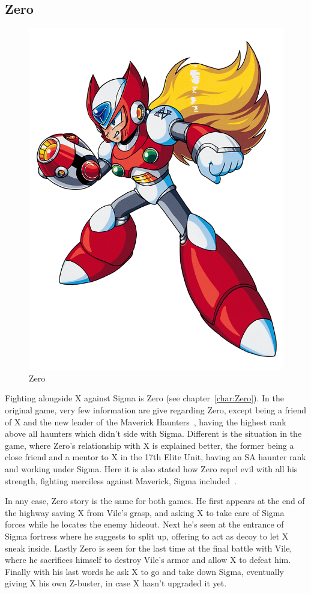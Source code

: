 \subsection{Zero}
\begin{figure}[htp]
	\centering
	\includegraphics[width=0.3\linewidth]{figures/X1/Zero_X1.png}
	\caption{Zero}
\end{figure}
Fighting alongside X against Sigma is Zero (see chapter~\ref{char:Zero}). In the original \x game, very few information are give regarding Zero, except being a friend of X and the new leader of the Maverick Haunters~\cite{X:Manual}, having the highest rank above all haunters which didn't side with Sigma. 
Different is the situation in the \mhx game, where Zero's relationship with X is explained better, the former being a close friend and a mentor to X in the 17th Elite Unit, having an SA haunter rank and working under Sigma. Here it is also stated how Zero repel evil with all his strength, fighting merciless against Maverick, Sigma included~\cite{Xcoll1:Manual_X1}.  

In any case, Zero story is the same for both games. He first appears at the end of the highway saving X from Vile's grasp, and asking X to take care of Sigma forces while he locates the enemy hideout. Next he's seen at the entrance of Sigma fortress where he suggests to split up, offering to act as decoy to let X sneak inside. Lastly Zero is seen for the last time at the final battle with Vile, where he sacrifices himself to destroy Vile's armor and allow X to defeat him. Finally with his last words he ask X to go and take down Sigma, eventually giving X his own Z-buster, in case X hasn't upgraded it yet.

